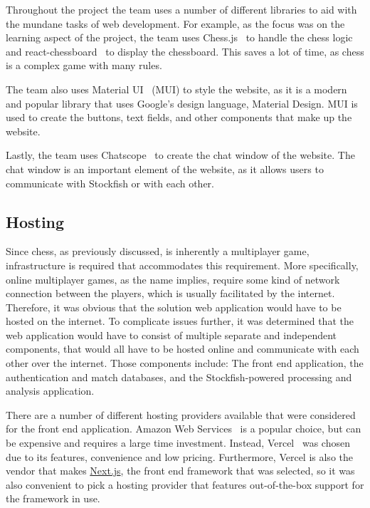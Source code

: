 Throughout the project the team uses a number of different libraries to aid with the mundane tasks of web development.
For example, as the focus was on the learning aspect of the project, the team uses Chess.js~\cite{chess.js} to handle
the chess logic and react-chessboard~\cite{react-chessboard} to display the chessboard.
This saves a lot of time, as chess is a complex game with many rules.

The team also uses Material UI~\cite{mui} (MUI) to style the website, as it is a modern and popular library that
uses Google's design language, Material Design.
MUI is used to create the buttons, text fields, and other components that make up the website.

Lastly, the team uses Chatscope~\cite{chatscope} to create the chat window of the website.
The chat window is an important element of the website, as it allows users to communicate with Stockfish or with each
other.


\subsection{Hosting}\label{subsec:hosting}

Since chess, as previously discussed, is inherently a multiplayer game,
infrastructure is required that accommodates this requirement.
More specifically, online multiplayer games, as the name implies, require some kind of network connection between the
players, which is usually facilitated by the internet.
Therefore, it was obvious that the solution web application would have to be hosted on the internet.
To complicate issues further, it was determined that the web application would have to consist of multiple separate and
independent components, that would all have to be hosted online and communicate with each other over the internet.
Those components include: The front end application, the authentication and match databases, and the Stockfish-powered
processing and analysis application.

There are a number of different hosting providers available that were considered for the front end application.
Amazon Web Services~\cite{aws} is a popular choice, but can be expensive and requires a large time investment.
Instead, Vercel~\cite{vercel} was chosen due to its features, convenience and low pricing.
Furthermore, Vercel is also the vendor that makes \url{Next.js}, the front end framework that was selected,
so it was also convenient to pick a hosting provider that features out-of-the-box support for the framework in use.

